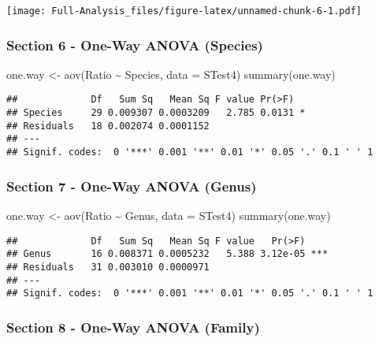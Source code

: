 \documentclass[
]{article}
\newenvironment{Shaded}{\begin{snugshade}}{\end{snugshade}}
\newcommand{\AttributeTok}[1]{\textcolor[rgb]{0.77,0.63,0.00}{#1}}
\newcommand{\FunctionTok}[1]{\textcolor[rgb]{0.00,0.00,0.00}{#1}}
\newcommand{\NormalTok}[1]{#1}
\newcommand{\OtherTok}[1]{\textcolor[rgb]{0.56,0.35,0.01}{#1}}
\newcommand{\SpecialCharTok}[1]{\textcolor[rgb]{0.00,0.00,0.00}{#1}}
\begin{document}
\texttt{[image: Full-Analysis\_files/figure-latex/unnamed-chunk-6-1.pdf]}

\hypertarget{section-6---one-way-anova-species}{%
\subsubsection{Section 6 - One-Way ANOVA
(Species)}\label{section-6---one-way-anova-species}}

\begin{Shaded}
\begin{Highlighting}[]
\NormalTok{one.way }\OtherTok{\textless{}{-}} \FunctionTok{aov}\NormalTok{(Ratio }\SpecialCharTok{\textasciitilde{}}\NormalTok{ Species, }\AttributeTok{data =}\NormalTok{ STest4)}
\FunctionTok{summary}\NormalTok{(one.way)}
\end{Highlighting}
\end{Shaded}

\begin{verbatim}
##             Df   Sum Sq   Mean Sq F value Pr(>F)  
## Species     29 0.009307 0.0003209   2.785 0.0131 *
## Residuals   18 0.002074 0.0001152                 
## ---
## Signif. codes:  0 '***' 0.001 '**' 0.01 '*' 0.05 '.' 0.1 ' ' 1
\end{verbatim}

\hypertarget{section-7---one-way-anova-genus}{%
\subsubsection{Section 7 - One-Way ANOVA
(Genus)}\label{section-7---one-way-anova-genus}}

\begin{Shaded}
\begin{Highlighting}[]
\NormalTok{one.way }\OtherTok{\textless{}{-}} \FunctionTok{aov}\NormalTok{(Ratio }\SpecialCharTok{\textasciitilde{}}\NormalTok{ Genus, }\AttributeTok{data =}\NormalTok{ STest4)}
\FunctionTok{summary}\NormalTok{(one.way)}
\end{Highlighting}
\end{Shaded}

\begin{verbatim}
##             Df   Sum Sq   Mean Sq F value   Pr(>F)    
## Genus       16 0.008371 0.0005232   5.388 3.12e-05 ***
## Residuals   31 0.003010 0.0000971                     
## ---
## Signif. codes:  0 '***' 0.001 '**' 0.01 '*' 0.05 '.' 0.1 ' ' 1
\end{verbatim}

\hypertarget{section-8---one-way-anova-family}{%
\subsubsection{Section 8 - One-Way ANOVA
(Family)}\label{section-8---one-way-anova-family}}
\end{document}
